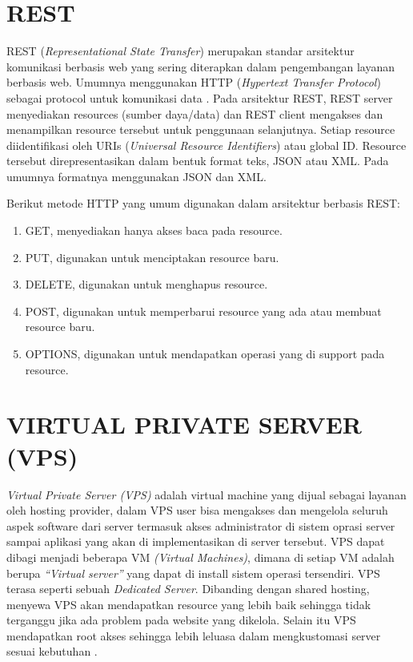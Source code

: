 \section{\uppercase{REST}}
REST (\textit{Representational State Transfer}) merupakan standar arsitektur komunikasi berbasis web yang sering diterapkan dalam pengembangan layanan berbasis web. Umumnya menggunakan HTTP (\textit{Hypertext Transfer Protocol}) sebagai protocol untuk komunikasi data \citep{fielding2000architectural}. Pada arsitektur REST, REST server menyediakan resources (sumber daya/data) dan REST client mengakses dan menampilkan resource tersebut untuk penggunaan selanjutnya. Setiap resource diidentifikasi oleh URIs (\textit{Universal Resource Identifiers}) atau global ID. Resource tersebut direpresentasikan dalam bentuk format teks, JSON atau XML. Pada umumnya formatnya menggunakan JSON dan XML.

\par Berikut metode HTTP yang umum digunakan dalam arsitektur berbasis REST:
\begin{enumerate}
	\item GET, menyediakan hanya akses baca pada resource.
	\item PUT, digunakan untuk menciptakan resource baru.
	\item DELETE, digunakan untuk menghapus resource.
	\item POST, digunakan untuk memperbarui resource yang ada atau membuat resource baru.
	\item OPTIONS, digunakan untuk mendapatkan operasi yang di support pada resource.
\end{enumerate}

\section{\uppercase{Virtual Private Server (VPS)}}
\textit{Virtual Private Server (VPS)} adalah virtual machine yang dijual sebagai layanan oleh hosting provider, dalam VPS user bisa mengakses dan mengelola seluruh aspek software dari server termasuk akses administrator di sistem oprasi server sampai aplikasi yang akan di implementasikan di server tersebut. VPS dapat dibagi menjadi beberapa VM \textit{(Virtual Machines)}, dimana di setiap VM adalah berupa \textit{“Virtual server”} yang dapat di install sistem operasi tersendiri. VPS terasa seperti sebuah \textit{Dedicated Server}. Dibanding dengan shared hosting, menyewa VPS akan mendapatkan resource yang lebih baik sehingga tidak terganggu jika ada problem pada website yang dikelola. Selain itu VPS mendapatkan root akses sehingga lebih leluasa dalam mengkustomasi server sesuai kebutuhan \citep{hamida2017analisis}.

